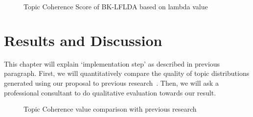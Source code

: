 \documentclass[senior]{IPSstyle}
\begin{document}
\begin{figure}[h]
	\centering
	\caption{Topic Coherence Score of BK-LFLDA based on lambda value}
\label{fig_tmbklflda}
\end{figure}

\chapter{Results and Discussion} 
\label{chapter_4}

This chapter will explain ‘implementation step’ as described in previous paragraph. First, we will quantitatively compare the quality of topic distributions generated using our proposal to previous research~\cite{goto2}. Then, we will ask a professional consultant to do qualitative evaluation towards our result.

\begin{figure}[h]
	\centering
	\caption{Topic Coherence value comparison with previous research}
\label{fig_tme3}
\end{figure}
\end{document}
